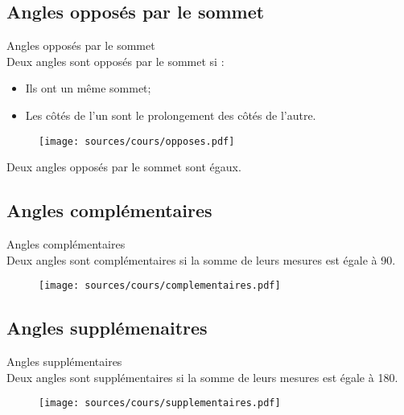 \documentclass[paper=a4, fontsize=10pt]{scrartcl} %
\begin{document}
\subsection{Angles opposés par le sommet}
\begin{multicols}{2}
  \begin{Definition}{Angles opposés par le sommet}\\
    Deux angles sont opposés par le sommet si :
    \begin{itemize}
    \item Ils ont un même sommet;
    \item Les côtés de l'un sont le prolongement des côtés de l'autre.
    \end{itemize}
  \end{Definition}
  \begin{figure}[H]
    \centering
    \texttt{[image: sources/cours/opposes.pdf]}
  \end{figure}
\end{multicols}

\begin{Proposition}
  Deux angles opposés par le sommet sont égaux.
\end{Proposition}


\subsection{Angles complémentaires}
\begin{multicols}{2}

  \begin{Definition}{Angles complémentaires}\\
    Deux angles sont complémentaires si la somme de leurs mesures est égale à 90.
  \end{Definition}
  \begin{figure}[H]
    \centering
    \texttt{[image: sources/cours/complementaires.pdf]}
  \end{figure}
\end{multicols}

\subsection{Angles supplémenaitres}
\begin{multicols}{2}
  \begin{Definition}{Angles supplémentaires}\\
    Deux angles sont supplémentaires si la somme de leurs mesures est égale à 180.
  \end{Definition}
  \begin{figure}[H]
    \centering
    \texttt{[image: sources/cours/supplementaires.pdf]}
  \end{figure}
\end{multicols}
\end{document}
